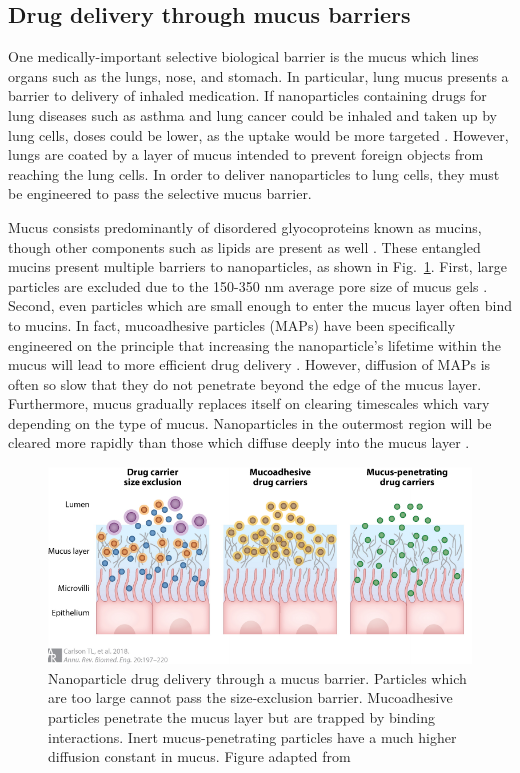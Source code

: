 \subsection{Drug delivery through mucus barriers}

One medically-important selective biological barrier is the mucus which lines organs such as the lungs, nose, and stomach.  In particular, lung mucus presents a barrier to delivery of inhaled medication.  If nanoparticles containing drugs for lung diseases such as asthma and lung cancer could be inhaled and taken up by lung cells, doses could be lower, as the uptake would be more targeted \cite{carlson18,schneider17}.  However, lungs are coated by a layer of mucus intended to prevent foreign objects from reaching the lung cells.  In order to deliver nanoparticles to lung cells, they must be engineered to pass the selective mucus barrier.

Mucus consists predominantly of disordered glyocoproteins known as mucins, though other components such as lipids are present as well \cite{witten17}.  These entangled mucins present multiple barriers to nanoparticles, as shown in Fig.~\ref{fig:mucus}.  First, large particles are excluded due to the 150-350 nm average pore size of mucus gels \cite{lai10,lai11}.  Second, even particles which are small enough to enter the mucus layer often bind to mucins.  In fact, mucoadhesive particles (MAPs) have been specifically engineered on the principle that increasing the nanoparticle's lifetime within the mucus will lead to more efficient drug delivery \cite{peppas85}.  However, diffusion of MAPs is often so slow that they do not penetrate beyond the edge of the mucus layer.  Furthermore, mucus gradually replaces itself on clearing timescales which vary depending on the type of mucus.  Nanoparticles in the outermost region will be cleared more rapidly than those which diffuse deeply into the mucus layer \cite{lay03}.

\begin{figure}
\centering
\includegraphics[width=0.8\linewidth]{figs/ch01/carlson-mucus.pdf}
\caption[Nanoparticle drug delivery through a mucus barrier.]{ Nanoparticle drug delivery through a mucus barrier.  Particles which are too large cannot pass the size-exclusion barrier.  Mucoadhesive particles penetrate the mucus layer but are trapped by binding interactions.  Inert mucus-penetrating particles have a much higher diffusion constant in mucus.  Figure adapted from \cite{carlson18,popov16}}
\label{fig:mucus}
\end{figure}

